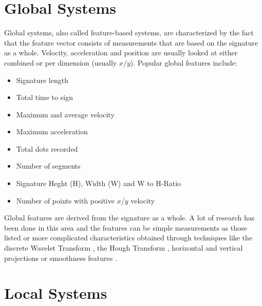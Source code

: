 \documentclass[a4paper, oneside]{csthesis}
\begin{document}
\section{Global Systems}
\label{sec:features}

Global systems, also called feature-based systems, are characterized by the fact that the feature vector consists of measurements that are based on the signature as a whole. Velocity, acceleration and position are usually looked at either combined or per dimension (usually $x/y$). Popular global features include:

\begin{itemize}
\item Signature length
\item Total time to sign
\item Maximum and average velocity
\item Maximum acceleration
\item Total dots recorded
\item Number of segments
\item Signature Heght (H), Width (W) and W to H-Ratio
\item Number of points with positive $x$/$y$ velocity
\end{itemize}


Global features are derived from the signature as a whole. A lot of research has been done in this area and the features can be simple measurements as those listed or more complicated characteristics obtained through techniques like the discrete Wavelet Transform \cite{ji2005signature}, the Hough Transform \cite{kaewkongka1999off}, horizontal and vertical projections \cite{fang2003off} or smoothness features \cite{fang2001offline}.







\section{Local Systems}
\label{sec:functions}
\end{document}
